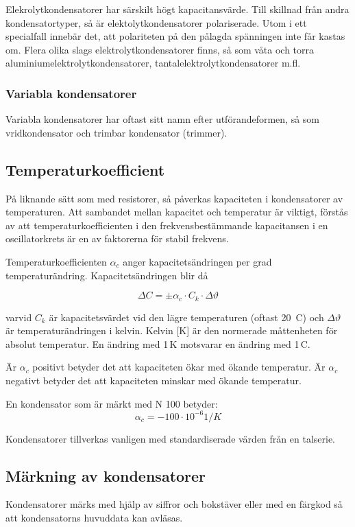 Elekrolytkondensatorer har särskilt högt kapacitansvärde. Till skillnad från
andra kondensatortyper, så är elektolytkondensatorer polariserade. Utom i ett
specialfall innebär det, att polariteten på den pålagda spänningen inte får
kastas om. Flera olika slags elektrolytkondensatorer finns, så som våta
och torra aluminiumelektrolytkondensatorer, tantalelektrolytkondensatorer m.fl.

\subsubsection{Variabla kondensatorer}
Variabla kondensatorer har oftast sitt namn efter utförandeformen, så som
vridkondensator och trimbar kondensator (trimmer).

\subsection{Temperaturkoefficient}
På liknande sätt som med resistorer, så påverkas kapaciteten i kondensatorer av
temperaturen. Att sambandet mellan kapacitet och temperatur är viktigt, förstås
av att temperaturkoefficienten i den frekvensbestämmande kapacitansen i en
oscillatorkrets är en av faktorerna för stabil frekvens.

Temperaturkoefficienten \(\alpha _c\) anger kapacitetsändringen per grad temperaturändring.
Kapacitetsändringen blir då

\[  \Delta C = \pm \alpha _c \cdot C_k \cdot \Delta\vartheta  \]

varvid \(C_k\) är kapacitetsvärdet vid den lägre temperaturen (oftast 20~\degree C) och
\(\Delta\vartheta\) är temperaturändringen i kelvin.
Kelvin [K] är den normerade måttenheten för absolut temperatur.
En ändring med 1\,K motsvarar en ändring med 1\degree\,C.

Är \(\alpha _c\) positivt betyder det att kapaciteten ökar med ökande
temperatur. Är \(\alpha _c\) negativt betyder det att kapaciteten minskar med ökande
temperatur.

En kondensator som är märkt med N 100 betyder:
\[ \alpha _c = -100 \cdot 10^{-6} 1/\unit{K}  \]


Kondensatorer tillverkas vanligen med standardiserade värden från en talserie.

\subsection{Märkning av kondensatorer}

Kondensatorer märks med hjälp av siffror och bokstäver eller med en färgkod så att
kondensatorns huvuddata kan avläsas.
